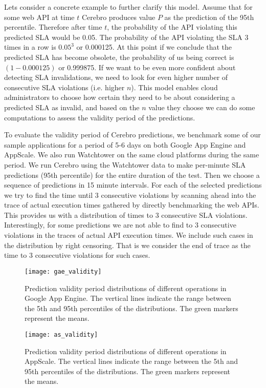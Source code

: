 Lets consider a concrete example to further clarify this model. Assume that for some web API at time $t$ Cerebro produces value $P$ as the 
prediction of the 95th percentile. Therefore after time $t$, the probability of the API violating this predicted SLA would be 0.05. The probability of the API
violating the SLA 3 times in a row is $0.05^3$ or 0.000125. At this point if we conclude that the predicted SLA has become obsolete, the probability of us
being correct is $(1 - 0.000125)$ or 0.999875. If we want to be even more confident about detecting SLA invalidations, we need to look for even higher
number of consecutive SLA violations (i.e. higher $n$). This model enables cloud administrators to choose how certain they need to be about
considering a predicted SLA as invalid, and based on the $n$ value they choose we can do some computations to assess the
validity period of the predictions. 

To evaluate the validity period of Cerebro predictions, we benchmark some of our sample applications for a period of 5-6 days on both
Google App Engine and AppScale. We also run Watchtower on the same cloud platforms during the same period. We run Cerebro using
the Watchtower data to make per-minute SLA predictions (95th percentile) for the entire duration of the test. Then we choose a sequence of predictions
in 15 minute intervals. For each of the selected predictions we try to find the time until 3 consecutive violations by scanning ahead into the trace of
actual execution times gathered by directly benchmarking the web APIs. This provides us with a distribution of times to 3 consecutive SLA violations.
Interestingly, for some predictions we are not able to find to 3 consecutive violations in the traces of actual API execution times. We include
such cases in the distribution by right censoring. That is we consider the end of trace as the time to 3 consecutive violations for such cases.

\begin{figure}
\centering
\texttt{[image: gae\_validity]}
\caption{Prediction validity period distributions of different operations in Google App Engine. The vertical lines indicate the range between the 5th and 95th percentiles of the 
distributions. The green markers represent the means.}
\label{fig:gae_validity}
\end{figure}

\begin{figure}
\centering
\texttt{[image: as\_validity]}
\caption{Prediction validity period distributions of different operations in AppScale. The vertical lines indicate the range between the 5th and 95th percentiles of the 
distributions. The green markers represent the means.}
\label{fig:as_validity}
\end{figure}